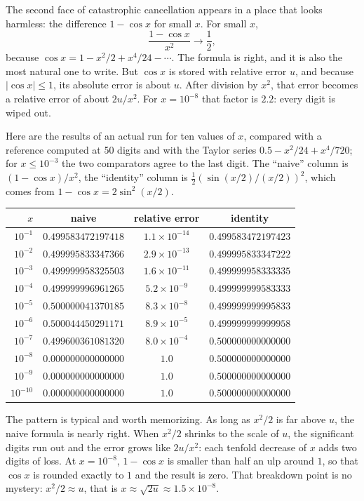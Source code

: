 The second face of catastrophic cancellation appears in a place that looks harmless:
the difference $1-\cos x$ for small $x$. For small $x$,
\[
  \frac{1-\cos x}{x^{2}}\longrightarrow\frac{1}{2},
\]
because $\cos x=1-x^{2}/2+x^{4}/24-\cdots$. The formula is right, and it is also the
most natural one to write. But $\cos x$ is stored with relative error $u$, and because
$|\cos x|\le1$, its absolute error is about $u$. After division by $x^{2}$, that error
becomes a relative error of about $2u/x^{2}$. For $x=10^{-8}$ that factor is $2.2$:
every digit is wiped out.

Here are the results of an actual run for ten values of $x$, compared with a reference
computed at 50 digits and with the Taylor series $0.5-x^{2}/24+x^{4}/720$; for
$x\le10^{-3}$ the two comparators agree to the last digit. The ``naive'' column is
$(1-\cos x)/x^{2}$, the ``identity'' column is
$\tfrac12\left(\sin(x/2)/(x/2)\right)^{2}$, which comes from
$1-\cos x=2\sin^{2}(x/2)$.

\begin{center}
\begin{tabular}{rccc}
\hline
$x$ & naive & relative error & identity \\
\hline
$10^{-1}$ & $0.499583472197418$ & $1.1\times10^{-14}$ & $0.499583472197423$ \\
$10^{-2}$ & $0.499995833347366$ & $2.9\times10^{-13}$ & $0.499995833347222$ \\
$10^{-3}$ & $0.499999958325503$ & $1.6\times10^{-11}$ & $0.499999958333335$ \\
$10^{-4}$ & $0.499999996961265$ & $5.2\times10^{-9}$ & $0.499999999583333$ \\
$10^{-5}$ & $0.500000041370185$ & $8.3\times10^{-8}$ & $0.499999999995833$ \\
$10^{-6}$ & $0.500044450291171$ & $8.9\times10^{-5}$ & $0.499999999999958$ \\
$10^{-7}$ & $0.499600361081320$ & $8.0\times10^{-4}$ & $0.500000000000000$ \\
$10^{-8}$ & $0.000000000000000$ & $1.0$ & $0.500000000000000$ \\
$10^{-9}$ & $0.000000000000000$ & $1.0$ & $0.500000000000000$ \\
$10^{-10}$ & $0.000000000000000$ & $1.0$ & $0.500000000000000$ \\
\hline
\end{tabular}
\end{center}

The pattern is typical and worth memorizing. As long as $x^{2}/2$ is far above $u$, the
naive formula is nearly right. When $x^{2}/2$ shrinks to the scale of $u$, the
significant digits run out and the error grows like $2u/x^{2}$: each tenfold decrease of
$x$ adds two digits of loss. At $x=10^{-8}$, $1-\cos x$ is smaller than half an ulp
around $1$, so that $\cos x$ is rounded exactly to $1$ and the result is zero. That
breakdown point is no mystery: $x^{2}/2\approx u$, that is $x\approx\sqrt{2u}\approx1.5\times10^{-8}$.

